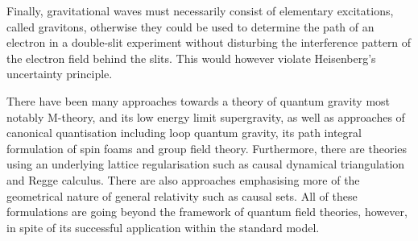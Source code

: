 \documentclass[11pt]{book} %
\numberwithin{equation}{chapter}
\begin{document}
Finally, gravitational waves must necessarily consist of elementary excitations, called gravitons,
otherwise they could be used to determine the path of an electron in a double-slit experiment
without disturbing the interference pattern of the electron field behind the slits. This would
however violate Heisenberg's uncertainty principle.

There have been many approaches towards a theory of quantum gravity
most notably M-theory,
and its low energy limit supergravity,
as well as approaches of canonical quantisation including loop
quantum gravity, its path integral formulation of spin foams and
group field theory. Furthermore, there are theories using an underlying
lattice regularisation such as causal dynamical triangulation and
Regge calculus. There are also approaches emphasising more of the geometrical
nature of general relativity such as causal sets.
All of these formulations are going beyond the framework of quantum
field theories, however, in spite of its successful application within the standard model.
\end{document}
